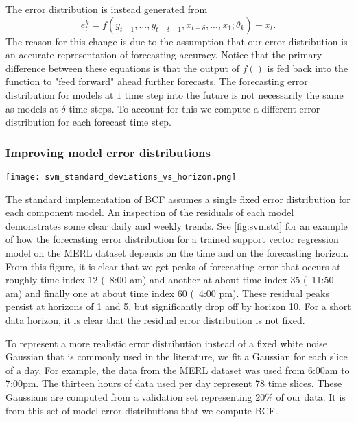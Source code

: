 The error distribution is instead generated from 
\begin{equation}
e_{t}^{k} = f(y_{t - 1}, ..., y_{t - \delta + 1}, x_{t - \delta}, ..., x_{1};\theta_{k}) - x_{t}.
\end{equation}
The reason for this change is due to the assumption that our error distribution is an accurate representation of forecasting accuracy.  Notice that the primary difference between these equations is that the output of $f()$ is fed back into the function to "feed forward" ahead further forecasts.  
The forecasting error distribution for models at $1$ time step into the future is not necessarily the same as models at $\delta$ time steps.  To account for this we compute a different error distribution for each forecast time step.


\subsubsection{Improving model error distributions}

\begin{figure*}[t]
\centering
\texttt{[image: svm\_standard\_deviations\_vs\_horizon.png]}
\caption{Standard deviation of support vector machine residuals for all Wednesdays in MERL dataset.  Time index represents 10 minute intervals from 6:00am to 7:00pm.}
\label{fig:svmstd}
\end{figure*}

The standard implementation of BCF assumes a single fixed error distribution for each component model.  An inspection of the residuals of each model demonstrates some clear daily and weekly trends.  See \ref{fig:svmstd} for an example of how the forecasting error distribution for a trained support vector regression model on the MERL dataset depends on the time and on the forecasting horizon.  From this figure, it is clear that we get peaks of forecasting error that occurs at roughly time index 12 (~8:00 am) and another at about time index 35 (~11:50 am) and finally one at about time index 60 (~4:00 pm).  These residual peaks persist at horizons of 1 and 5, but significantly drop off by horizon 10.  For a short data horizon, it is clear that the residual error distribution is not fixed.

To represent a more realistic error distribution instead of a fixed white noise Gaussian that is commonly used in the literature, we fit a Gaussian for each slice of a day.  For example, the data from the MERL dataset was used from 6:00am to 7:00pm. The thirteen hours of data used per day represent 78 time slices.  These Gaussians are computed from a validation set representing 20\% of our data.  It is from this set of model error distributions that we compute BCF.

